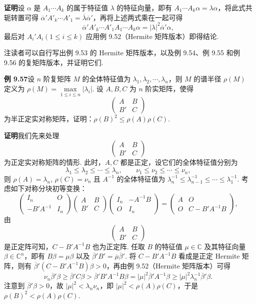 \documentclass[UTF8,12pt,a4paper,fontset=fandol]{ctexart}
\begin{document}
\noindent\textbf{证明}\quad 设 $\alpha$ 是 $A_1\cdots A_k$ 的属于特征值 $\lambda$ 的特征向量，即有 $A_1\cdots A_k\alpha=\lambda\alpha$，将此式共轭转置可得 $\overline{\alpha}'A'_k\cdots A'_1=\overline{\lambda}\overline{\alpha}'$，再将上述两式乘在一起可得
\[
\overline{\alpha}'A'_k\cdots A'_1A_1\cdots A_k\alpha=|\lambda|^2\overline{\alpha}'\alpha,
\]
最后对 $A_i'A_i(1\le i\le k)$ 应用例 9.52（Hermite 矩阵版本）即得结论.

注\quad 读者可以自行写出例 9.53 的 Hermite 矩阵版本，以及例 9.54、例 9.55 和例 9.56 的复矩阵版本，并证明它们.

\noindent\textbf{例 9.57}\quad 设 $n$ 阶复矩阵 $M$ 的全体特征值为 $\lambda_1,\lambda_2,\cdots,\lambda_n$，则 $M$ 的谱半径 $\rho(M)$ 定义为 $\rho(M)=\max\limits_{1\le i\le n}|\lambda_i|$. 设 $A,B,C$ 为 $n$ 阶实矩阵，使得
\[
\begin{pmatrix}
A&B\\
B'&C
\end{pmatrix}
\]
为半正定实对称矩阵，证明：$\rho(B)^2\le\rho(A)\rho(C)$.

\noindent\textbf{证明}\quad 我们先来处理
\[
\begin{pmatrix}
A&B\\
B'&C
\end{pmatrix}
\]
为正定实对称矩阵的情形. 此时，$A,C$ 都是正定，设它们的全体特征值分别为
\[
\lambda_1\le\lambda_2\le\cdots\le\lambda_n,\qquad
\nu_1\le\nu_2\le\cdots\le\nu_n,
\]
则 $\rho(A)=\lambda_n$, $\rho(C)=\nu_n$ 且 $A^{-1}$ 的全体特征值为 $\lambda_n^{-1}\le\lambda_{n-1}^{-1}\le\cdots\le\lambda_1^{-1}$. 考虑如下对称分块初等变换：
\[
\begin{pmatrix}
I_n&O\\
-B'A^{-1}&I_n
\end{pmatrix}
\begin{pmatrix}
A&B\\
B'&C
\end{pmatrix}
\begin{pmatrix}
I_n&-A^{-1}B\\
O&I_n
\end{pmatrix}
=
\begin{pmatrix}
A&O\\
O&C-B'A^{-1}B
\end{pmatrix},
\]
由
\[
\begin{pmatrix}
A&B\\
B'&C
\end{pmatrix}
\]
是正定阵可知，$C-B'A^{-1}B$ 也为正定阵. 任取 $B$ 的特征值 $\mu\in\mathbb{C}$ 及其特征向量 $\beta\in\mathbb{C}^n$，即有 $B\beta=\mu\beta$ 以及 $\overline{\beta}'B'=\overline{\mu}\overline{\beta}'$. 将 $C-B'A^{-1}B$ 看成是正定 Hermite 矩阵，则有 $\overline{\beta}'(C-B'A^{-1}B)\beta>0$，再由例 9.52（Hermite 矩阵版本）可得
\[
\nu_n\overline{\beta}'\beta\ge\overline{\beta}'C\beta>\overline{\beta}'B'A^{-1}B\beta=|\mu|^2\overline{\beta}'A^{-1}\beta\ge|\mu|^2\lambda_n^{-1}\overline{\beta}'\beta.
\]
注意到 $\overline{\beta}'\beta>0$，故 $|\mu|^2<\lambda_n\nu_n$，即 $|\mu|^2<\rho(A)\rho(C)$，于是 $\rho(B)^2<\rho(A)\rho(C)$.
\end{document}
